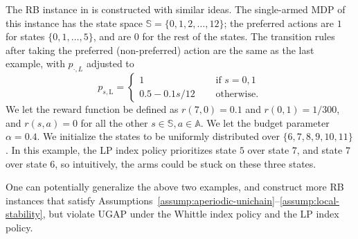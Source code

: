 \documentclass[11pt,letterpaper]{article}
\theoremstyle{plain}
\theoremstyle{definition}
\theoremstyle{remark}
\newcommand{\sspa}{\mathbb{S}}
\newcommand{\aspa}{\mathbb{A}}
\newcommand{\leftsub}{\text{L}}
\begin{document}
The RB instance in  is constructed with similar ideas. The single-armed MDP of this instance has the state space $\sspa = \{0,1,2, \dots, 12\}$; the preferred actions are $1$ for states $\{0,1,\dots, 5\}$, and are $0$ for the rest of the states. The transition rules after taking the preferred (non-preferred) action are the same as the last example, with $p_{\cdot, L}$ adjusted to 
\[
     p_{s, \leftsub} =
     \begin{cases}
         1 \quad &  \text{ if } s =0,1 \\
         0.5 - 0.1 s / 12 \quad & \text{ otherwise}.
     \end{cases}
\]
We let the reward function be defined as $r(7, 0) = 0.1$ and $r(0,1)=1/300$, and $r(s,a)=0$ for all the other  $s\in\sspa,a\in\aspa$.  
We let the budget parameter $\alpha = 0.4$. 
We initialize the states to be uniformly distributed over $\{6,7,8,9,10,11\}$. 
In this example, the LP index policy prioritizes state $5$ over state $7$, and state $7$ over state $6$, so intuitively, the arms could be stuck on these three states. 

One can potentially generalize the above two examples, and construct more RB instances that satisfy Assumptions~\ref{assump:aperiodic-unichain}--\ref{assump:local-stability}, but violate UGAP under the Whittle index policy and the LP index policy. 










\end{document}
